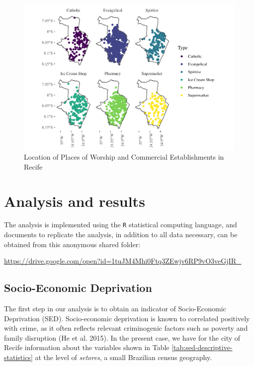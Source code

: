 \documentclass[smallextended]{svjour3}       %
\begin{document}
\begin{figure}

\includegraphics{Moral_Communities_and_Crime_files/figure-latex/fig-plot-events-1} \hfill{}

\caption{\label{fig:plot-events}Location of Places of Worship and Commercial Establishments in Recife}\label{fig:fig-plot-events}
\end{figure}

\hypertarget{results}{%
\section{Analysis and results}\label{results}}

The analysis is implemented using the \texttt{R} statistical computing
language, and documents to replicate the analysis, in addition to all
data necessary, can be obtained from this anonymous shared folder:

\url{https://drive.google.com/open?id=1tuJM4Mhi0Ftq3ZEwjv6RP9vO3veGjIR_}

\hypertarget{socio-economic-deprivation}{%
\subsection{Socio-Economic
Deprivation}\label{socio-economic-deprivation}}

The first step in our analysis is to obtain an indicator of
Socio-Economic Deprivation (SED). Socio-economic deprivation is known to
correlated positively with crime, as it often reflects relevant
criminogenic factors such as poverty and family disruption (He et al.
2015). In the present case, we have for the city of Recife information
about the variables shown in Table \ref{tab:sed-descriptive-statistics}
at the level of \emph{setores}, a small Brazilian census geography.
\end{document}
